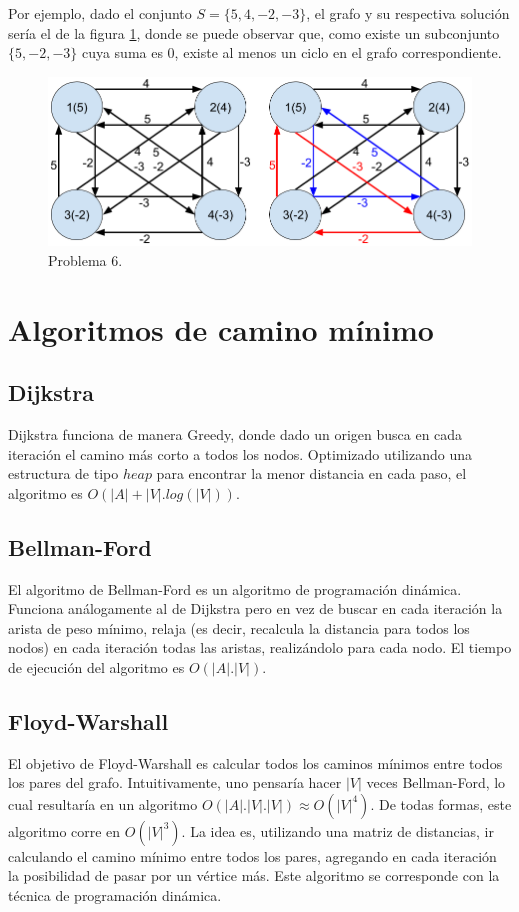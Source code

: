 \documentclass[a4paper,10pt]{article}
\begin{document}
	Por ejemplo, dado el conjunto $S = \{5, 4, -2, -3\}$, el grafo y su respectiva solución sería el de la figura \ref{fig:punto-6}, donde se puede observar que, como existe un subconjunto $\{5, -2, -3\}$ cuya suma es 0, existe al menos un ciclo en el grafo correspondiente.

	\begin{figure}[!htb]
		\centering
		\includegraphics[scale=0.4]{images/grafo-6.png}
		\caption{Problema 6.}
		\label{fig:punto-6}
	\end{figure}

\section{Algoritmos de camino mínimo}
\subsection{Dijkstra}
	Dijkstra funciona de manera Greedy, donde dado un origen busca en cada iteración el camino más corto a todos los nodos. Optimizado utilizando una estructura de tipo $heap$ para encontrar la menor distancia en cada paso, el algoritmo es $O(|A|+|V|.log(|V|))$.

\subsection{Bellman-Ford}
	El algoritmo de Bellman-Ford es un algoritmo de programación dinámica. Funciona análogamente al de Dijkstra pero en vez de buscar en cada iteración la arista de peso mínimo, relaja (es decir, recalcula la distancia para todos los nodos) en cada iteración todas las aristas, realizándolo para cada nodo. El tiempo de ejecución del algoritmo es $O(|A|.|V|)$.

\subsection{Floyd-Warshall}
	El objetivo de Floyd-Warshall es calcular todos los caminos mínimos entre todos los pares del grafo. Intuitivamente, uno pensaría hacer $|V|$ veces Bellman-Ford, lo cual resultaría en un algoritmo $O(|A|.|V|.|V|) \approx O(|V|^4)$. De todas formas, este algoritmo corre en $O(|V|^3)$. La idea es, utilizando una matriz de distancias, ir calculando el camino mínimo entre todos los pares, agregando en cada iteración la posibilidad de pasar por un vértice más. Este algoritmo se corresponde con la técnica de programación dinámica.
\end{document}
